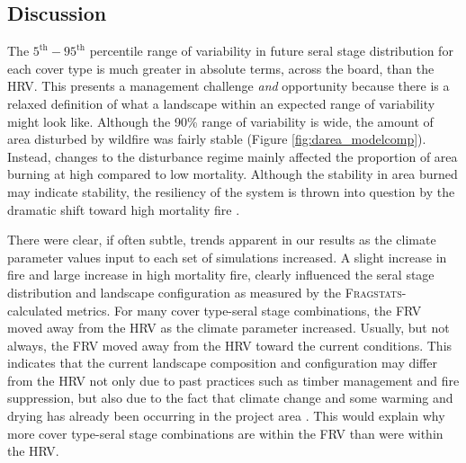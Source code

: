 \documentclass[12pt]{article}
\begin{document}
\begin{spacing}{1}
\clearpage



\section{Discussion}


The $5^{\text{th}} - 95^{\text{th}}$ percentile range of variability in future seral stage distribution for each cover type is much greater in absolute terms, across the board, than the HRV. This presents a management challenge \emph{and} opportunity because there is a relaxed definition of what a landscape within an expected range of variability might look like. Although the 90\% range of variability is wide, the amount of area disturbed by wildfire was fairly stable (Figure \ref{fig:darea_modelcomp}). Instead, changes to the disturbance regime mainly affected the proportion of area burning at high compared to low mortality. Although the stability in area burned may indicate stability, the resiliency of the system is thrown into question by the dramatic shift toward high mortality fire \citep{Stephens2013,Lydersen2014,Miller2012}.

There were clear, if often subtle, trends apparent in our results as the climate parameter values input to each set of simulations increased. A slight increase in fire and large increase in high mortality fire, clearly influenced the seral stage distribution and landscape configuration as measured by the \textsc{Fragstats}-calculated metrics. For many cover type-seral stage combinations, the FRV moved away from the HRV as the climate parameter increased. Usually, but not always, the FRV moved away from the HRV toward the current conditions. This indicates that the current landscape composition and configuration may differ from the HRV not only due to past practices such as timber management and fire suppression, but also due to the fact that climate change and some warming and drying has already been occurring in the project area \citep{Dale2001}. This would explain why more cover type-seral stage combinations are within the FRV than were within the HRV.


\end{spacing}
\end{document}
